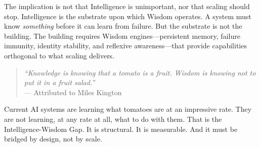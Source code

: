 \documentclass{article}
\begin{document}
The implication is not that Intelligence is unimportant, nor that
scaling should stop. Intelligence is the substrate upon which Wisdom
operates. A system must know \emph{something} before it can learn from
failure. But the substrate is not the building. The building requires
Wisdom engines---persistent memory, failure immunity, identity
stability, and reflexive awareness---that provide capabilities
orthogonal to what scaling delivers.

\begin{quote}
\textit{``Knowledge is knowing that a tomato is a fruit.
Wisdom is knowing not to put it in a fruit salad.''}\\
--- Attributed to Miles Kington
\end{quote}

Current AI systems are learning what tomatoes are at an impressive rate.
They are not learning, at any rate at all, what to do with them.
That is the Intelligence-Wisdom Gap. It is structural. It is measurable.
And it must be bridged by design, not by scale.



\end{document}
